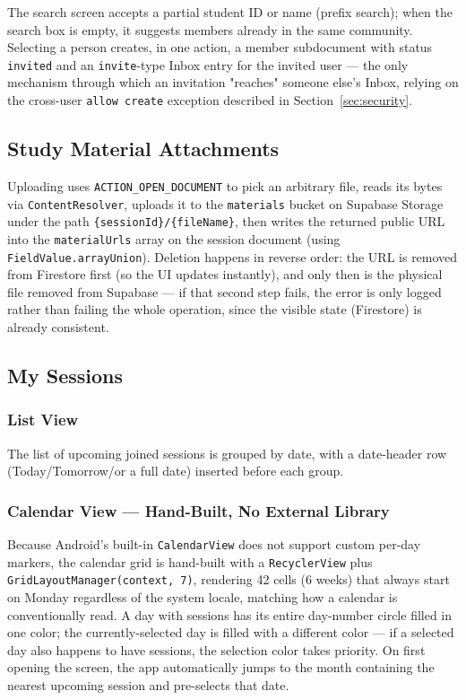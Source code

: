 The search screen accepts a partial student ID or name (prefix search); when the search box is empty, it suggests members already in the same community. Selecting a person creates, in one action, a member subdocument with status \texttt{invited} and an \texttt{invite}-type Inbox entry for the invited user — the only mechanism through which an invitation "reaches" someone else's Inbox, relying on the cross-user \texttt{allow create} exception described in Section~\ref{sec:security}.

\subsection{Study Material Attachments}

Uploading uses \texttt{ACTION\_OPEN\_DOCUMENT} to pick an arbitrary file, reads its bytes via \texttt{ContentResolver}, uploads it to the \texttt{materials} bucket on Supabase Storage under the path \texttt{\{sessionId\}/\{fileName\}}, then writes the returned public URL into the \texttt{materialUrls} array on the session document (using \texttt{FieldValue.arrayUnion}). Deletion happens in reverse order: the URL is removed from Firestore first (so the UI updates instantly), and only then is the physical file removed from Supabase — if that second step fails, the error is only logged rather than failing the whole operation, since the visible state (Firestore) is already consistent.

\subsection{My Sessions}

\subsubsection{List View}

The list of upcoming joined sessions is grouped by date, with a date-header row (Today/Tomorrow/or a full date) inserted before each group.

\subsubsection{Calendar View --- Hand-Built, No External Library}

Because Android's built-in \texttt{CalendarView} does not support custom per-day markers, the calendar grid is hand-built with a \texttt{RecyclerView} plus \texttt{GridLayoutManager(context, 7)}, rendering 42 cells (6 weeks) that always start on Monday regardless of the system locale, matching how a calendar is conventionally read. A day with sessions has its entire day-number circle filled in one color; the currently-selected day is filled with a different color — if a selected day also happens to have sessions, the selection color takes priority. On first opening the screen, the app automatically jumps to the month containing the nearest upcoming session and pre-selects that date.

